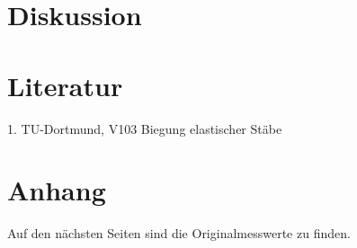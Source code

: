 \section{Diskussion}
\label{sec:diskussion}



\section{Literatur}
\label{sec:Literatur}
1. TU-Dortmund, V103 Biegung elastischer Stäbe

\section{Anhang}
\label{sec:anhang}
Auf den nächsten Seiten sind die Originalmesswerte zu finden.